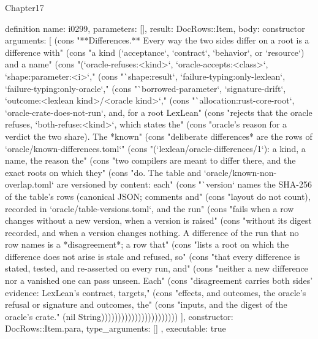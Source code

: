 \begin{lexlean}{Chapter17}
\begin{semanticmodule}
definition{
  name: i0299,
  parameters: [],
  result: DocRows::Item,
  body: constructor{
    arguments: [
      (cons "**Differences.** Every way the two sides differ on a root is a difference with" (cons "a kind (`acceptance`, `contract`, `behavior`, or `resource`) and a name" (cons "(`oracle-refuses:<kind>`, `oracle-accepts:<class>`, `shape:parameter:<i>`," (cons "`shape:result`, `failure-typing:only-lexlean`, `failure-typing:only-oracle`," (cons "`borrowed-parameter`, `signature-drift`, `outcome:<lexlean kind>/<oracle kind>`," (cons "`allocation:rust-core-root`, `oracle-crate-does-not-run`, and, for a root LexLean" (cons "rejects that the oracle refuses, `both-refuse:<kind>`, which states the" (cons "oracle's reason for a verdict the two share). The *known" (cons "deliberate differences* are the rows of `oracle/known-differences.toml`" (cons "(`lexlean/oracle-differences/1`): a kind, a name, the reason the" (cons "two compilers are meant to differ there, and the exact roots on which they" (cons "do. The table and `oracle/known-non-overlap.toml` are versioned by content: each" (cons "`version` names the SHA-256 of the table's rows (canonical JSON; comments and" (cons "layout do not count), recorded in `oracle/table-versions.toml`, and the run" (cons "fails when a row changes without a new version, when a version is raised" (cons "without its digest recorded, and when a version changes nothing. A difference of the run that no row names is a *disagreement*; a row that" (cons "lists a root on which the difference does not arise is stale and refused, so" (cons "that every difference is stated, tested, and re-asserted on every run, and" (cons "neither a new difference nor a vanished one can pass unseen. Each" (cons "disagreement carries both sides' evidence: LexLean's contract, targets," (cons "effects, and outcomes, the oracle's refusal or signature and outcomes, the" (cons "inputs, and the digest of the oracle's crate." (nil String)))))))))))))))))))))))
    ],
    constructor: DocRows::Item.para,
    type_arguments: []
  },
  executable: true
}


\end{semanticmodule}
\end{lexlean}
